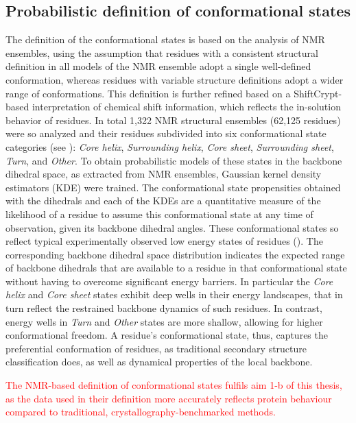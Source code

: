\subsection{Probabilistic definition of conformational states}

The definition of the conformational states is based on the analysis of NMR ensembles, using the assumption that residues with a consistent structural definition in all models of the NMR ensemble adopt a single well-defined conformation, whereas residues with variable structure definitions adopt a wider range of conformations. This definition is further refined based on a ShiftCrypt-based interpretation of chemical shift information, which reflects the in-solution behavior of residues. In total 1,322 NMR structural ensembles (62,125 residues) were so analyzed and their residues subdivided into six conformational state categories (see ):  \textit{Core helix}, \textit{Surrounding helix}, \textit{Core sheet}, \textit{Surrounding sheet}, \textit{Turn}, and \textit{Other}. To obtain probabilistic models of these states in the backbone dihedral space, as extracted from NMR ensembles, Gaussian kernel density estimators (KDE) were trained. The conformational state propensities obtained with the dihedrals and each of the KDEs are a quantitative measure of the likelihood of a residue to assume this conformational state at any time of observation, given its backbone dihedral angles. These conformational states so reflect typical experimentally observed low energy states of residues (). The corresponding backbone dihedral space distribution indicates the expected range of backbone dihedrals that are available to a residue in that conformational state without having to overcome significant energy barriers. In particular the \textit{Core helix} and \textit{Core sheet} states exhibit deep wells in their energy landscapes, that in turn reflect the restrained backbone dynamics of such residues. In contrast, energy wells in \textit{Turn} and \textit{Other} states are more shallow, allowing for higher conformational freedom. A residue's conformational state, thus, captures the preferential conformation of residues, as traditional secondary structure classification does, as well as dynamical properties of the local backbone. 

\textcolor{red}{The NMR-based definition of conformational states fulfils aim 1-b of this thesis, as the data used in their definition more accurately reflects protein behaviour compared to traditional, crystallography-benchmarked methods.}

